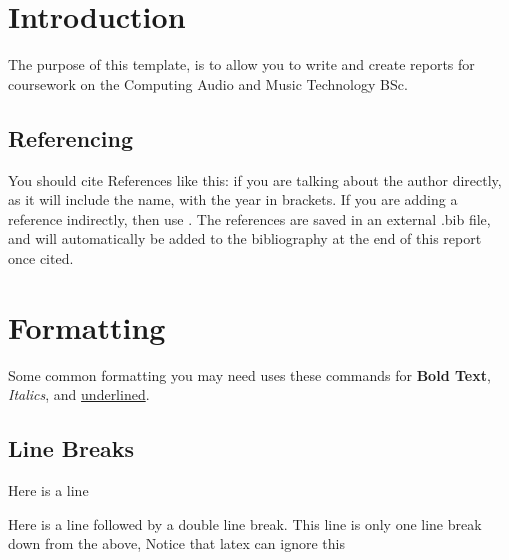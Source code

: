 \def\mytitle{Coursework Report Title}
\def\myauthor{My Name}
\def\mymodule{Music Fundamentals, Acoustics, and Perception (CAMT 401)}


	\maketitle
	
	\section{Introduction}
	The purpose of this template, is to allow you to write and create reports for coursework on the Computing Audio and Music Technology BSc.
	
	\subsection{Referencing}
	You should cite References like this: \cite{Keshav} if you are talking about the author directly, as it will include the name, with the year in brackets. If you are adding a reference indirectly, then use \citep{Keshav}. The references are saved in an external .bib file, and will automatically be added to the bibliography at the end of this report once cited.
	
	
	\section{Formatting}
	Some common formatting you may need uses these commands for \textbf{Bold Text}, \textit{Italics}, and \underline{underlined}.
	\subsection{Line Breaks}
	Here is a line
	
	Here is a line followed by a double line break.
	This line is only one line break down from the above, Notice that latex can ignore this
	
